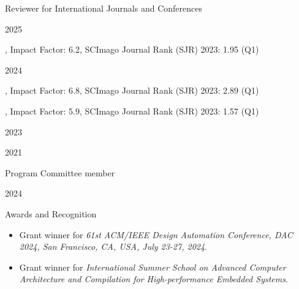 \documentclass[
	a4paper, %
	10pt, %
]{tresume} %
\begin{document}
%
\begin{tSection}{Reviewer for International Journals and Conferences}
  \begin{tSubsection}{2025}{}{}{}
  \item {}, Impact Factor: 6.2, SCImago Journal Rank (SJR) 2023: 1.95 (Q1)
  \item {}
  \end{tSubsection}
  \begin{tSubsection}{2024}{}{}{}
  \item {}
  \item {}, Impact Factor: 6.8, SCImago Journal Rank (SJR) 2023: 2.89 (Q1)
  \item {}, Impact Factor: 5.9, SCImago Journal Rank (SJR) 2023: 1.57 (Q1)
  \end{tSubsection}
  \begin{tSubsection}{2023}{}{}{}
  \item {}
  \item {}
  \end{tSubsection}
  \begin{tSubsection}{2021}{}{}{}
  \item {}
  \end{tSubsection}
\end{tSection}
%
\begin{tSection}{Program Committee member}
  \begin{tSubsection}{2024}{}{}{}
    \item {}
\end{tSubsection}
\end{tSection}
%
\begin{tSection}{Awards and Recognition}
  \begin{itemize}
  \item[2024] Grant winner for \emph{61st ACM/IEEE Design Automation
      Conference, DAC 2024, San Francisco, CA, USA, July 23-27,
      2024}.
  \item[2021] Grant winner for \emph{International Summer School on Advanced
      Computer Architecture and Compilation for High-performance Embedded
      Systems}.
  \end{itemize}
\end{tSection}
\end{document}
